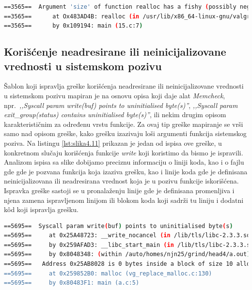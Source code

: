 \documentclass[12pt,oneside]{memoir}
\theoremstyle{plain}
\theoremstyle{definition}
\begin{document}

\begin{lstlisting}[style=terminal,caption={Ispis greške sumnjive vrednosti argumenta}, label={lst:slika4.10},language={bash}]   
==3565==  Argument 'size' of function realloc has a fishy (possibly negative) value: -12
==3565==      at Ox483AD4B: realloc (in /usr/lib/x86_64-linux-gnu/valgrind/vgpreload_memcheck-amd64-linux.so) 
==3565==      by 0x109194: main (15.c:7)
\end{lstlisting}

\subsection{Korišćenje neadresirane ili neinicijalizovane vrednosti u sistemskom pozivu}
Šablon koji ispravlja greške korišćenja neadresirane ili neinicijalizovane vrednosti u sistemskom pozivu mapiran je na osnovu opisa koji daje alat \textit{Memcheck}, npr.~\textit{,,Syscall param write(buf) points to uninitialised byte(s)''}, \textit{,,Syscall param exit\_group(status) contains uninitialised byte(s)''}, ili nekim drugim opisom karakterističnim za određenu vrstu funkcije. Za ovaj tip greške mapiranje se vrši samo nad opisom greške, kako grešku izazivaju loši argumenti funkcija sistemskog poziva. Na listingu \ref{lst:slika4.11} prikazan je jedan od ispisa ove greške, u konkretnom slučaju korišćenja funkcije \textit{write} koji koristimo da bismo je ispravili. Analizom ispisa sa slike dobijamo preciznu informaciju o liniji koda, kao i o fajlu gde gde je pozvana funkcija koja izaziva grešku, kao i linije koda gde je definisana neinicijalizovana ili neadresirana vrednost koja je u pozivu funkcije iskorišćena. Ispravka greške sastoji se u pronalaženju linije gde je definisana promenljiva i njena zamena ispravljenom linijom ili blokom koda koji sadrži tu liniju i dodatni k\^od koji ispravlja grešku.  

\begin{lstlisting}[style=terminal,caption={Primer ispisa greške korišćenja neinicializovane ili neadresirane vrednosti u sistemskom pozivu}, label={lst:slika4.11},language={bash}] 
==5695==  Syscall param write(buf) points to uninitialised byte(s)
==5695==     at 0x25A48723: __write_nocancel (in /lib/tls/libc-2.3.3.so)
==5695==     by 0x259AFAD3: __libc_start_main (in /lib/tls/libc-2.3.3.so)
==5695==     by 0x8048348: (within /auto/homes/njn25/grind/head4/a.out)
==5695==   Address 0x25AB8028 is 0 bytes inside a block of size 10 alloc'd
==5695==     at 0x259852B0: malloc (vg_replace_malloc.c:130)
==5695==     by 0x80483F1: main (a.c:5)
\end{lstlisting}
\end{document}
